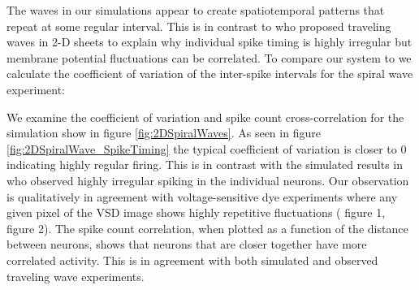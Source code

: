 The waves in our simulations appear to create spatiotemporal patterns that repeat at some regular interval.
This is in contrast to \citet{keane2015} who proposed traveling waves in 2-D sheets to explain why individual spike timing is highly irregular 
but membrane potential fluctuations can be correlated.
To compare our system to \citet{keane2015} we calculate the coefficient of variation of the inter-spike intervals for the spiral wave experiment:

We examine the coefficient of variation and spike count cross-correlation for the simulation show in figure \ref{fig:2DSpiralWaves}.
As seen in figure \ref{fig:2DSpiralWave_SpikeTiming} the typical coefficient of variation is closer to 0 indicating highly regular firing.
This is in contrast with the simulated results in \citet{keane2015} who observed highly irregular spiking in the individual neurons.
Our observation is qualitatively in agreement with voltage-sensitive dye experiments where any given pixel of the VSD image shows highly repetitive fluctuations (\citet{Huang2010} figure 1, \citet{huang2004} figure 2). 
The spike count correlation, when plotted as a function of the distance between neurons, shows that neurons that are closer together have more correlated activity.
This is in agreement with both simulated and observed traveling wave experiments.

